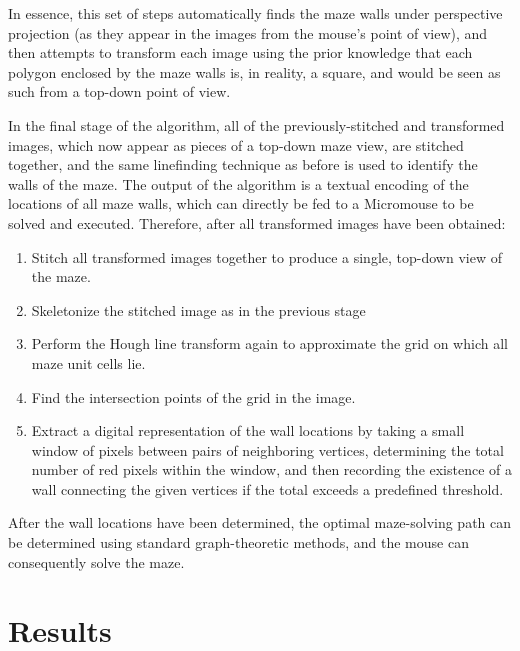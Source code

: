 \documentclass[10pt,twocolumn,letterpaper]{article}
\begin{document}
In essence, this set of steps automatically finds the maze walls under perspective projection (as they appear in the
images from the mouse's point of view), and then attempts to transform each image using the prior knowledge that each
polygon enclosed by the maze walls is, in reality, a square, and would be seen as such from a top-down point of view.

In the final stage of the algorithm, all of the previously-stitched and transformed images, which now appear as pieces
of a top-down maze view, are stitched together, and the same linefinding technique as before is used to identify the
walls of the maze.  The output of the algorithm is a textual encoding of the locations of all maze walls, which can
directly be fed to a Micromouse to be solved and executed.  Therefore, after all transformed images have been obtained:

\begin{enumerate}
	\item Stitch all transformed images together to produce a single, top-down view of the maze.
	\item Skeletonize the stitched image as in the previous stage
	\item Perform the Hough line transform again to approximate the grid on which all maze unit cells lie.
	\item Find the intersection points of the grid in the image.
	\item Extract a digital representation of the wall locations by taking a small window of pixels between pairs of
	neighboring vertices, determining the total number of red pixels within the window, and then recording the existence
	of a wall connecting the given vertices if the total exceeds a predefined threshold.
\end{enumerate}

After the wall locations have been determined, the optimal maze-solving path can be determined using standard 
graph-theoretic methods, and the mouse can consequently solve the maze.

\section{Results}
\label{sec:results}
\end{document}
